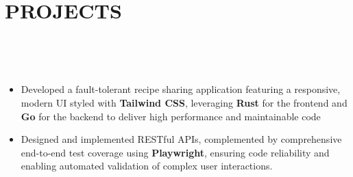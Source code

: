 \documentclass[12pt,letterpaper,roman]{moderncv}
\makeatletter
\def \scaleFont {0.945} %
\def \headingSpace {-7.5mm * \real{\scaleFont}} %
\def \scaleHeadings {1.15}
\def \itemSpacing {-3.5mm}
\newcommand*{\customcvproject}[4][.25em]{
  \begin{tabular}{@{}l}
    {\relscale{\scaleHeadings}\bfseries #2}
  \end{tabular}
  \hfill%
  \begin{tabular}{l@{}}
     {\textcolor{blue}{#3}}
  \end{tabular}\\[-5.5mm]
  \ifx&#4&
  \else{\\
    \begin{minipage}{\maincolumnwidth}
      \small#4
    \end{minipage}}\fi
  \par\addvspace{#1}\leavevmode \\[0mm]}
\makeatother
\begin{document}
\section{PROJECTS} \leavevmode \\[\headingSpace]
{~\\[-20mm]
{\begin{itemize} \relscale{\scaleFont}
	\item Developed a fault-tolerant recipe sharing application featuring a responsive, modern UI styled with \textbf{Tailwind CSS}, leveraging \textbf{Rust} for the frontend and \textbf{Go} for the backend to deliver high performance and maintainable code~\\[\itemSpacing]
	\item Designed and implemented RESTful APIs, complemented by comprehensive end-to-end test coverage using \textbf{Playwright}, ensuring code reliability and enabling automated validation of complex user interactions.
\end{itemize}
}
~\\[-13mm]

}
\end{document}
